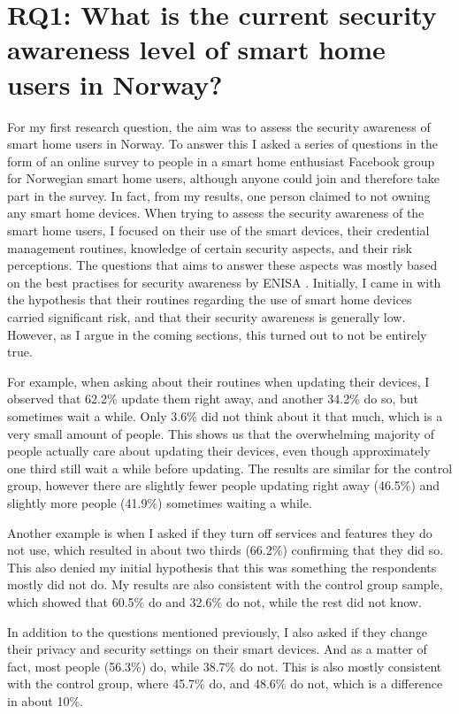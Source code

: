 \section{RQ1: What is the current security awareness level of smart home users in Norway?}
For my first research question, the aim was to assess the security awareness of smart home users in Norway. To answer this I asked a series of questions in the form of an online survey to people in a smart home enthusiast Facebook group for Norwegian smart home users, although anyone could join and therefore take part in the survey. In fact, from my results, one person claimed to not owning any smart home devices. When trying to assess the security awareness of the smart home users, I focused on their use of the smart devices, their credential management routines, knowledge of certain security aspects, and their risk perceptions. The questions that aims to answer these aspects was mostly based on the best practises for security awareness by ENISA \cite{ENISA2015SmartHome}. Initially, I came in with the hypothesis that their routines regarding the use of smart home devices carried significant risk, and that their security awareness is generally low. However, as I argue in the coming sections, this turned out to not be entirely true. 

For example, when asking about their routines when updating their devices, I observed that 62.2\% update them right away, and another 34.2\% do so, but sometimes wait a while. Only 3.6\% did not think about it that much, which is a very small amount of people. This shows us that the overwhelming majority of people actually care about updating their devices, even though approximately one third still wait a while before updating. The results are similar for the control group, however there are slightly fewer people updating right away (46.5\%) and slightly more people (41.9\%) sometimes waiting a while. 

Another example is when I asked if they turn off services and features they do not use, which resulted in about two thirds (66.2\%) confirming that they did so. This also denied my initial hypothesis that this was something the respondents mostly did not do. My results are also consistent with the control group sample, which showed that 60.5\% do and 32.6\% do not, while the rest did not know. 

In addition to the questions mentioned previously, I also asked if they change their privacy and security settings on their smart devices. And as a matter of fact, most people (56.3\%) do, while 38.7\% do not. This is also mostly consistent with the control group, where 45.7\% do, and 48.6\% do not, which is a difference in about 10\%. 

